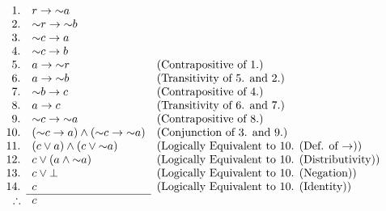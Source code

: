 \documentclass[a4paper,12pt]{report}
\begin{document}
\newpage
{}
\sol
$$
	\argument{
		1. & r \lthen \lnot a \\
		2. & \lnot r \lthen \lnot b \\
		3. & \lnot c \lthen a \\
		4. & \lnot c \lthen b \\
		5. & a \lthen \lnot r & \text{(Contrapositive of 1.)} \\
		6. & a \lthen \lnot b & \text{(Transitivity of 5. and 2.)} \\
		7. & \lnot b \lthen c & \text{(Contrapositive of 4.)} \\
		8. & a \lthen c & \text{(Transitivity of 6. and 7.)} \\
		9. & \lnot c \lthen \lnot a & \text{(Contrapositive of 8.)} \\
		10. & \bracks{\lnot c \lthen a}\land\bracks{\lnot c \lthen \lnot a} & \text{(Conjunction of 3. and 9.)} \\
		11. & \bracks{c \lor a}\land\bracks{c \lor \lnot a} & \text{(Logically Equivalent to 10. (Def. of $\lthen$))} \\
		12. & c \lor \bracks{a\land\lnot a} & \text{(Logically Equivalent to 10. (Distributivity))} \\
		13. & c \lor \bot & \text{(Logically Equivalent to 10. (Negation))} \\
		14. & c & \text{(Logically Equivalent to 10. (Identity))} \\
	}{c}
$$
\end{document}
